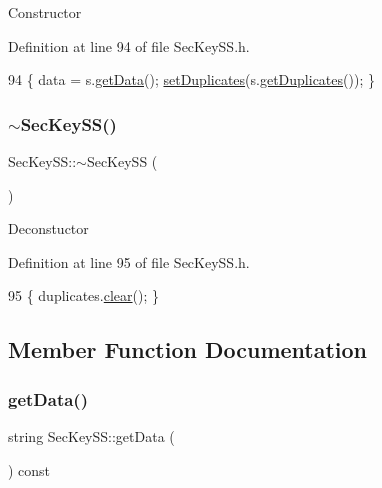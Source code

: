 Constructor 

Definition at line 94 of file Sec\+Key\+S\+S.\+h.


\begin{DoxyCode}
94 \{ data = s.\hyperlink{classSecKeySS_add52510d280d0ca89b653386500f08f5}{getData}(); \hyperlink{classSecKeySS_ac1d550d7d3ad864f169d63523031a341}{setDuplicates}(s.\hyperlink{classSecKeySS_aaae9db891cfcdc3f78d8a44145f4f08c}{getDuplicates}()); \}
\end{DoxyCode}
\mbox{\label{classSecKeySS_a298a0bd8755355351318c8f45f879e09}} 
\subsubsection{\texorpdfstring{$\sim$\+Sec\+Key\+S\+S()}{~SecKeySS()}}
{\footnotesize\ttfamily Sec\+Key\+S\+S\+::$\sim$\+Sec\+Key\+SS (\begin{DoxyParamCaption}{ }\end{DoxyParamCaption})}

Deconstuctor 

Definition at line 95 of file Sec\+Key\+S\+S.\+h.


\begin{DoxyCode}
95 \{ duplicates.\hyperlink{classLinkedList_a7d1d9cf83eef67b6c4d700a3cc5970e1}{clear}(); \}
\end{DoxyCode}


\subsection{Member Function Documentation}
\mbox{\label{classSecKeySS_add52510d280d0ca89b653386500f08f5}} 
\subsubsection{\texorpdfstring{get\+Data()}{getData()}}
{\footnotesize\ttfamily string Sec\+Key\+S\+S\+::get\+Data (\begin{DoxyParamCaption}{ }\end{DoxyParamCaption}) const\hspace{0.3cm}{\ttfamily [inline]}}

